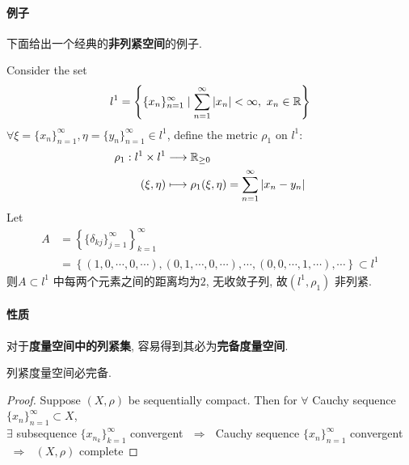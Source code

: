 \paragraph{例子}
	下面给出一个经典的\textbf{非列紧空间}的例子.
	\begin{example}\label{ex 1.3.1}
		Consider the set 
		\begin{align}
			l^1 = \left\{ \{ x_n \}_{n = 1}^{\infty} \mid \sum_{n = 1}^{\infty}{\left| x_n \right|} < \infty , \,\, x_n \in \mathbb{R} \right\}
		\end{align}
		$\forall \xi = \{ x_n \}_{n = 1}^{\infty} , \eta = \{ y_n \}_{n = 1}^{\infty} \in l^1$, define the metric $\rho_1$ on $l^1$:
		\begin{align}
			\rho_1 : l^1 \times l^1 &\longrightarrow \mathbb{R}_{\geq 0} \\
			(\xi , \eta) &\longmapsto \rho_1(\xi , \eta) = \sum_{n = 1}^{\infty}{\left| x_n - y_n \right|}
		\end{align}
		Let
		\begin{align}
			A &= \left\{ \{ \delta_{kj} \}_{j = 1}^{\infty} \right\}_{k = 1}^{\infty} \\
			&= \left\{ (1 , 0 , \cdots , 0 , \cdots) , (0 , 1 , \cdots , 0 , \cdots) , \cdots , (0 , 0 , \cdots , 1 , \cdots) , \cdots \right\}
			\subset l^1
		\end{align}
		则$A \subset l^1$ 中每两个元素之间的距离均为$2$, 无收敛子列, 故$(l^1 , \rho_1)$ 非列紧.
	\end{example}

\newpage

\paragraph{性质}
	对于\textbf{度量空间中的列紧集}, 容易得到其必为\textbf{完备度量空间}.
	\begin{proposition}\label{prop 1.3.1}
		\begin{center}
			列紧度量空间必完备.
		\end{center}
		
		\vspace*{4em}
		
		\begin{proof}
			Suppose $(X , \rho)$ be sequentially compact. Then for $\forall$ Cauchy sequence $\{ x_n \}_{n = 1}^{\infty} \subset X$, \\
			$\exists$ subsequence $\{ x_{n_k} \}_{k = 1}^{\infty}$ convergent $\,\, \Rightarrow \,\,$ Cauchy sequence $\{ x_n \}_{n = 1}^{\infty}$ convergent $\,\, \Rightarrow \,\,$ $(X , \rho)$ complete
		\end{proof}
	\end{proposition}

